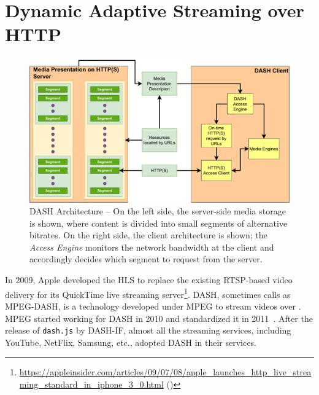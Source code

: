 \section{Dynamic Adaptive Streaming over HTTP}
\begin{figure}[!t]
	\centering
	\includegraphics[width=\linewidth]{img/DASH-arch}
	\caption{\small{DASH Architecture -- On the left side, the server-side media storage is shown, where content is divided into small segments of alternative bitrates. On the right side, the  client architecture is shown; the {\it {} Access Engine} monitors the network bandwidth at the client and accordingly decides which segment to request from the server.}}
	\label{fig:dash}
\end{figure}
In 2009, Apple developed the \ac{HLS} to replace the existing \ac{RTSP}-based video delivery for its QuickTime live streaming server\footnote{\url{https://appleinsider.com/articles/09/07/08/apple_launches_http_live_streaming_standard_in_iphone_3_0.html} (\lastaccessedtoday)}. \Ac{DASH}, sometimes calls as MPEG-DASH, is a technology developed under MPEG to stream videos over . MPEG started working for DASH in 2010 and standardized it in 2011~\cite{ISO/IEC23009-1:2019}. After the release of {\tt dash.js} by \ac{DASH-IF}, almost all the streaming services, including YouTube, NetFlix, Samsung, etc., adopted \ac{DASH} in their services.

